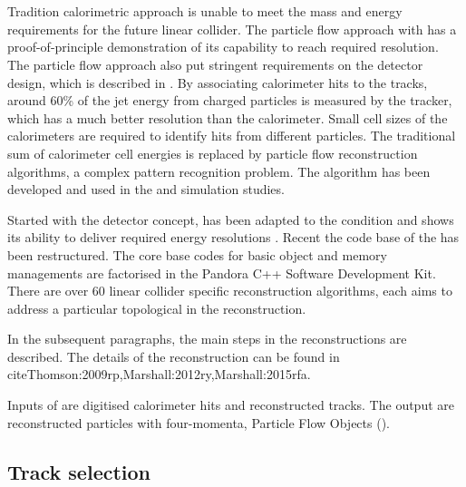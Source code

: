 
\section{\pandora}
\label{sec:pandoraPandoraPFA}
Tradition calorimetric approach is unable to meet the mass and energy requirements for the future linear collider. The particle flow approach with \pandora has a proof-of-principle demonstration of its capability to reach required resolution. The particle flow approach also put stringent requirements on the detector design, which is described in . By associating calorimeter hits to the tracks, around 60\% of the jet energy from charged particles is measured by the tracker, which has a much better resolution than the calorimeter. Small cell sizes of the calorimeters are required to identify hits from different particles. The traditional sum of calorimeter cell energies is replaced by particle flow reconstruction algorithms, a complex pattern recognition problem.  The \pandora algorithm has been developed and used in the \ILC and \CLIC simulation studies.

Started with the \ILD detector concept, \pandora has been adapted to the \CLIC condition and shows its ability to deliver required energy resolutions \cite{Linssen:2012hp}. Recent the code base of the \pandora has been restructured. The core base codes for basic object and memory managements are factorised in the Pandora C++ Software Development Kit\cite{Marshall:2015rfa}. There are over 60 linear collider specific reconstruction algorithms, each aims to address a particular topological in the reconstruction.

In the subsequent paragraphs, the main steps in the \pandora reconstructions are described. The details of the reconstruction can be found in cite{Thomson:2009rp,Marshall:2012ry,Marshall:2015rfa}.

Inputs of \pandora are digitised calorimeter hits and reconstructed tracks. The output are reconstructed particles with four-momenta, Particle Flow Objects (\PFOs).

\subsection{Track selection}

